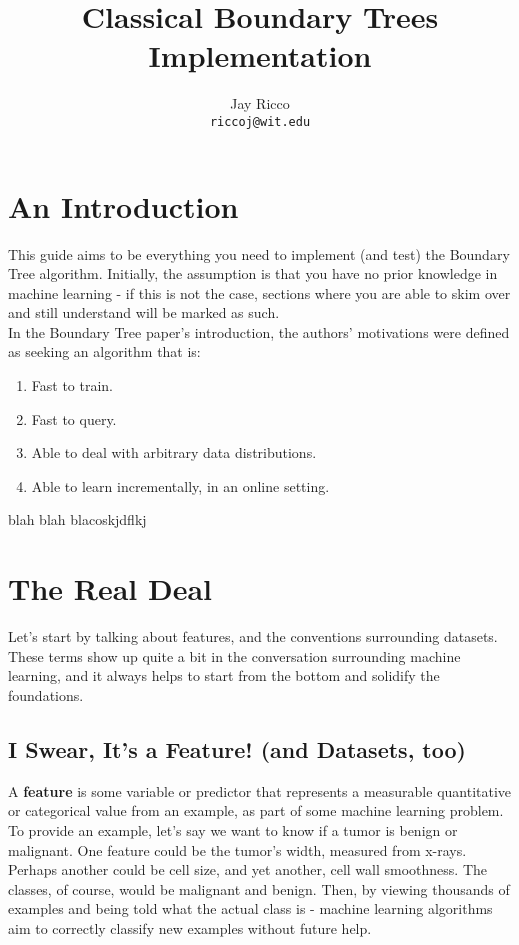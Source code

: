 \documentclass[12pt,letterpaper]{article}
\title{Classical Boundary Trees Implementation}
\author{
	Jay Ricco\\
	\small \texttt{riccoj@wit.edu}
}
\begin{document}
	\maketitle
	\section{An Introduction}
		This guide aims to be everything you need to implement (and test) the Boundary Tree algorithm. Initially, the assumption is that you have no prior knowledge in machine learning - if this is not the case, sections where you are able to skim over and still understand will be marked as such.\\
		
		In the Boundary Tree paper's introduction, the authors' motivations were defined as seeking an algorithm that is:
			\begin{enumerate}
				\item Fast to train.
				\item Fast to query.
				\item Able to deal with arbitrary data distributions.
				\item Able to learn incrementally, in an online setting.
			\end{enumerate}
		blah blah blacoskjdflkj

	\section{The Real Deal}
			Let's start by talking about features, and the conventions surrounding datasets. These terms show up quite a bit in the conversation surrounding machine learning, and it always helps to start from the bottom and solidify the foundations.\\
		\subsection{I Swear, It's a Feature! (and Datasets, too)}
			
			A \textbf{feature} is some variable or predictor that represents a measurable quantitative or categorical value from an example, as part of some machine learning problem.\\
			To provide an example, let's say we want to know if a tumor is benign or malignant. One feature could be the tumor's width, measured from x-rays. Perhaps another could be cell size, and yet another, cell wall smoothness. The classes, of course, would be malignant and benign. Then, by viewing thousands of examples and being told what the actual class is - machine learning algorithms aim to correctly classify new examples without future help.\\
			
\end{document}
